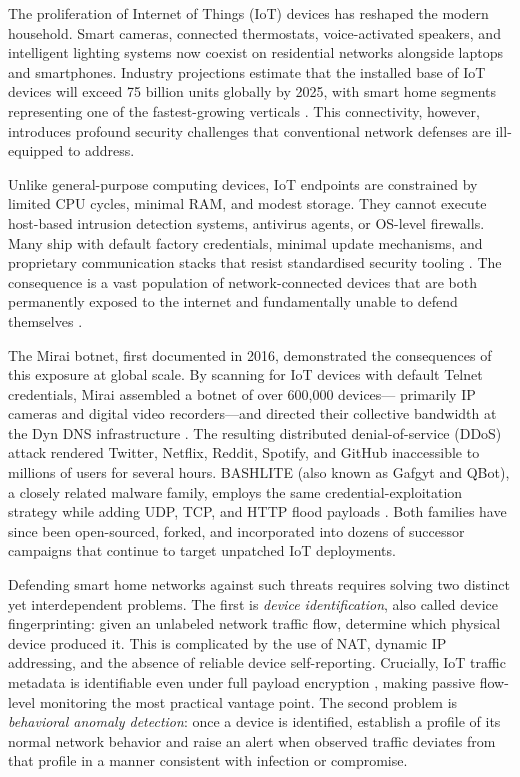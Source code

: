 \documentclass[conference]{IEEEtran}
\begin{document}
The proliferation of Internet of Things (IoT) devices has reshaped the
modern household. Smart cameras, connected thermostats, voice-activated
speakers, and intelligent lighting systems now coexist on residential
networks alongside laptops and smartphones. Industry projections estimate
that the installed base of IoT devices will exceed 75 billion units globally
by 2025, with smart home segments representing one of the fastest-growing
verticals \cite{alam2021survey,perera2014context}. This connectivity,
however, introduces profound security challenges that conventional network
defenses are ill-equipped to address.

Unlike general-purpose computing devices, IoT endpoints are constrained by
limited CPU cycles, minimal RAM, and modest storage. They cannot execute
host-based intrusion detection systems, antivirus agents, or OS-level
firewalls. Many ship with default factory credentials, minimal update
mechanisms, and proprietary communication stacks that resist standardised
security tooling \cite{kolias2017ddos}. The consequence is a vast population
of network-connected devices that are both permanently exposed to the
internet and fundamentally unable to defend themselves
\cite{heartfield2018taxonomy,bertino2017botnets}.

The Mirai botnet, first documented in 2016, demonstrated the consequences of
this exposure at global scale. By scanning for IoT devices with default
Telnet credentials, Mirai assembled a botnet of over 600,000 devices---
primarily IP cameras and digital video recorders---and directed their
collective bandwidth at the Dyn DNS infrastructure \cite{antonakakis2017understanding}.
The resulting distributed denial-of-service (DDoS) attack rendered Twitter,
Netflix, Reddit, Spotify, and GitHub inaccessible to millions of users for
several hours. BASHLITE (also known as Gafgyt and QBot), a closely related
malware family, employs the same credential-exploitation strategy while
adding UDP, TCP, and HTTP flood payloads \cite{kolias2017ddos}. Both
families have since been open-sourced, forked, and incorporated into dozens
of successor campaigns that continue to target unpatched IoT deployments.

Defending smart home networks against such threats requires solving two
distinct yet interdependent problems. The first is \textit{device
identification}, also called device fingerprinting: given an unlabeled
network traffic flow, determine which physical device produced it. This is
complicated by the use of NAT, dynamic IP addressing, and the absence of
reliable device self-reporting. Crucially, IoT traffic metadata is
identifiable even under full payload encryption \cite{apthorpe2016smart},
making passive flow-level monitoring the most practical vantage point. The second problem is \textit{behavioral
anomaly detection}: once a device is identified, establish a profile of its
normal network behavior and raise an alert when observed traffic deviates
from that profile in a manner consistent with infection or compromise.
\end{document}
